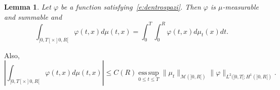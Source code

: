 \documentclass[11pt,leqno]{amsart}
\newtheorem{lemma}[theorem]{Lemma}
\numberwithin{equation}{section}
\begin{document}
\begin{lemma}
\label{l:measure}
   Let ${\varphi}$ be a function satisfying~\eqref{e:dentrospazi}. Then ${\varphi}$ is $\mu$-measurable and summable and 
   \begin{equation}
   \label{e:Fubini}
       \int_{]0, T[ \times ]0, R[} {\varphi}(t, x) d \mu(t, x)
       =
       \int_0^T \! \! \int_0^R 
       {\varphi}(t, x) d \mu_t (x) dt.
   \end{equation} 
\end{lemma}
Also, 
\begin{equation}
   \label{e:Fubini2}
      \left| \int_{]0, T[ \times ]0, R[} {\varphi}(t, x) d \mu(t, x) \right|
       \leq C(R)  \operatorname*{ess\,sup}_{0\le t\le T}
       \| \mu_t \|_{\mathcal M (]0,R[)} \| {\varphi} \|_{L^2 (]0, T[; H^1 (]0, R[)}.
  \end{equation} 
\end{document}
